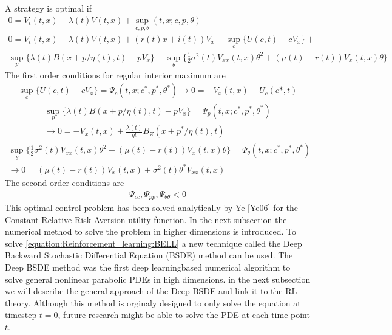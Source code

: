 \documentclass[letterpaper,10pt,english]{jupyterBook}
\begin{document}
\sphinxAtStartPar
A strategy is optimal if
\begin{gather*}
0 =V_t(t,x) -\lambda(t)V(t,x) + \sup_{c,p,\theta}(t,x;c,p,\theta)  \\
0 = V_t(t,x) -\lambda(t)V(t,x) + (r(t)x+ i(t))V_x + \sup_c\{U(c,t)-cV_x\} + \\ \sup_p\{\lambda(t)B(x + p/\eta(t),t) - pV_x\} + \sup_\theta \{ \frac{1}{2}\sigma^2(t)V_{xx}(t,x)\theta^2 +(\mu(t) - r(t))V_x(t,x)\theta\} 
\end{gather*}
\sphinxAtStartPar
The first order conditions for regular interior maximum are
\begin{equation}\label{equation:Financial_application:cons_cond}
\begin{split}\sup_c  \{ U(c,t) - cV_x\} = \Psi_c(t,x;c^*,p^*,\theta^*)  \rightarrow  0 = -V_x(t,x) + U_c(c*,t) \end{split}
\end{equation}\begin{equation}\label{equation:Financial_application:ins_cond}
\begin{split}\sup_p\{\lambda(t)B(x + p/\eta(t),t) - pV_x\} = \Psi_p(t,x;c^*,p^*,\theta^*) \\ \rightarrow 0 = -V_x(t,x) + \frac{\lambda(t)}{\eta{t}}B_Z(x + p^*/\eta(t),t)\end{split}
\end{equation}\begin{equation}\label{equation:Financial_application:inv_cond}
\begin{split}\sup_\theta \{ \frac{1}{2}\sigma^2(t)V_{xx}(t,x)\theta^2 +(\mu(t) - r(t))V_x(t,x)\theta\} = \Psi_\theta(t,x;c^*,p^*,\theta^*)\\ \rightarrow 0 = (\mu(t) -r(t))V_x(t,x) + \sigma^2(t)\theta^*V_{xx}(t,x)\end{split}
\end{equation}
\sphinxAtStartPar
The second order conditions are
\begin{equation*}
\begin{split} \Psi_{cc}, \Psi_{pp}, \Psi_{\theta \theta} < 0 \end{split}
\end{equation*}
\sphinxAtStartPar
This optimal control problem has been solved analytically by Ye {[}\hyperlink{cite.Discussion:id8}{Ye06}{]} for the Constant Relative Risk Aversion utility function. In the next subsection the numerical method to solve the problem in higher dimensions is introduced. To solve \eqref{equation:Reinforcement_learning:BELL} a new technique called the Deep Backward Stochastic Differential Equation (BSDE) method can be used. The Deep BSDE method was the first deep learning\sphinxhyphen{}based numerical algorithm to solve general nonlinear parabolic PDEs in high dimensions. in the next subsection we will describe the general approach of the Deep BSDE and link it to the RL theory. Although this method is orginaly designed to only solve the equation at timestep \(t=0\), future research might be able to solve the PDE at each time point \(t\).
\end{document}
